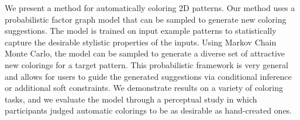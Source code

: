 We present a method for automatically coloring 2D patterns. Our method uses a probabilistic factor graph model that can be sampled to generate new coloring suggestions. The model is trained on input example patterns to statistically capture the desirable stylistic properties of the inputs. Using Markov Chain Monte Carlo, the model can be sampled to generate a diverse set of attractive new colorings for a target pattern. This probabilistic framework is very general and allows for users to guide the generated suggestions via conditional inference or additional soft constraints. We demonstrate results on a variety of coloring tasks, and we evaluate the model through a perceptual study in which participants judged automatic colorings to be as desirable as hand-created ones.


